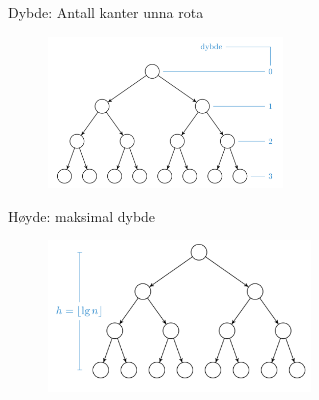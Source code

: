 \documentclass[12pt]{report}
\begin{document}
\vspace{\baselineskip}

\vspace{\baselineskip}
{\fontsize{13pt}{15.6pt}\selectfont Dybde: Antall kanter unna rota\par}\par




\begin{figure}[H]
	\begin{Center}
		\includegraphics[width=2.45in,height=1.58in]{./media/image72.png}
	\end{Center}
\end{figure}



\par

{\fontsize{13pt}{15.6pt}\selectfont Høyde: maksimal dybde\par}\par




\begin{figure}[H]
	\begin{Center}
		\includegraphics[width=2.74in,height=1.58in]{./media/image73.png}
	\end{Center}
\end{figure}


\end{document}
